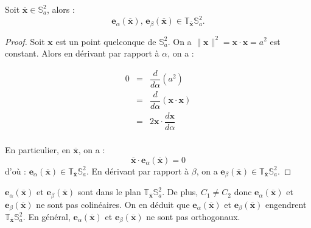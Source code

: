 \begin{proposition}
Soit $\overline{\mathbf{x}} \in \mathbb{S}_a^2$, alors :
\begin{equation}
\mathbf{e}_{\alpha}(\overline{\mathbf{x}})\text{, } \mathbf{e}_{\beta}(\overline{\mathbf{x}}) \in \mathbb{T}_{\overline{\mathbf{x}}} \mathbb{S}_a^2.
\end{equation}
\end{proposition}


\begin{proof}
Soit $\mathbf{x}$ est un point quelconque de $\mathbb{S}_a^2$. On a $\| \mathbf{x} \|^2 = \mathbf{x} \cdot \mathbf{x} = a^2$ est constant.
Alors en dérivant par rapport à $\alpha$, on a :
 
\begin{equation*}
\begin{array}{rcl}
0 & = & \dfrac{d}{d \alpha} ( a^2 )\\
  & = & \dfrac{d}{d \alpha} ( \mathbf{x} \cdot \mathbf{x} )\\
  & = & 2 \mathbf{x} \cdot \dfrac{d \mathbf{x}}{d \alpha}\\
\end{array}
\end{equation*}

En particulier, en $\overline{\mathbf{x}}$, on a :
\begin{equation}
\overline{\mathbf{x}} \cdot \mathbf{e}_{\alpha}(\overline{\mathbf{x}}) = 0
\end{equation}
d'où : $\mathbf{e}_{\alpha}(\overline{\mathbf{x}}) \in \mathbb{T}_{\overline{\mathbf{x}}} \mathbb{S}_a^2$. En dérivant par rapport à $\beta$, on a $\mathbf{e}_{\beta}(\overline{\mathbf{x}}) \in \mathbb{T}_{\overline{\mathbf{x}}} \mathbb{S}_a^2$.
\end{proof}

$\mathbf{e}_{\alpha}(\overline{\mathbf{x}})$ et $\mathbf{e}_{\beta}(\overline{\mathbf{x}})$ sont dans le plan $\mathbb{T}_{\overline{\mathbf{x}}}\mathbb{S}_a^2$. De plus, $C_1 \neq C_2$ donc $\mathbf{e}_{\alpha}(\overline{\mathbf{x}})$ et $\mathbf{e}_{\beta}(\overline{\mathbf{x}})$ ne sont pas colinéaires. On en déduit que $\mathbf{e}_{\alpha}(\overline{\mathbf{x}})$ et $\mathbf{e}_{\beta}(\overline{\mathbf{x}})$ engendrent $\mathbb{T}_{\overline{\mathbf{x}}} \mathbb{S}_a^2$. En général, $\mathbf{e}_{\alpha}(\overline{\mathbf{x}})$ et $\mathbf{e}_{\beta}(\overline{\mathbf{x}})$ ne sont pas orthogonaux.


